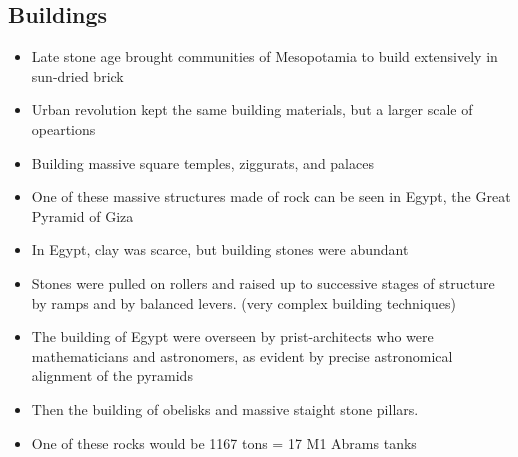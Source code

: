 \documentclass{article}
\begin{document}
\subsection{Buildings}
\begin{itemize}
  \item Late stone age brought communities of Mesopotamia to build extensively in
    sun-dried brick
  \item Urban revolution kept the same building materials,
    but a larger scale of opeartions
  \item Building massive square temples, ziggurats, and palaces
  \item One of these massive structures made of rock can be seen in Egypt, the Great Pyramid of Giza
  \item In Egypt, clay was scarce, but building stones were abundant
  \item Stones were pulled on rollers and raised up to successive stages of structure
    by ramps and by balanced levers. (very complex building techniques)
  \item The building of Egypt were overseen by prist-architects who were mathematicians and astronomers,
    as evident by precise astronomical alignment of the pyramids
  \item Then the building of obelisks and massive staight stone pillars.
  \item One of these rocks would be 1167 tons = 17 M1 Abrams tanks
\end{itemize}
\end{document}

